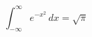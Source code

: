 \documentclass{article}
\begin{document}
\[
  \int_{-\infty}^{\infty} e^{-x^2}\,dx = \sqrt{\pi}
\]
\end{document}
